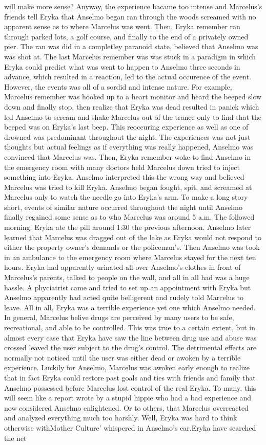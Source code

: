 \documentclass[12pt]{book}
\begin{document}
will make more sense? Anyway, the experience bacame too intense and Marcelus's friends tell Eryka that Anselmo began ran through the woods screamed with no apparent sense as to where Marcelus was went. Then, Eryka remember ran through parked lots, a golf course, and finally to the end of a privately owned pier. The ran was did in a completley paranoid state, believed that Anselmo was was shot at. The last Marcelus remember was was stuck in a paradigm in which Eryka could predict what was went to happen to Anselmo three seconds in advance, which resulted in a reaction, led to the actual occurence of the event. However, the events was all of a sordid and intense nature. For example, Marcelus remember was hooked up to a heart monitor and heard the beeped slow down and finally stop, then realize that Eryka was dead resulted in panick which led Anselmo to scream and shake Marcelus out of the trance only to find that the beeped was on Eryka's last beep. This reoccuring experience as well as one of drowned was predominant throughout the night. The experiences was not just thoughts but actual feelings as if everything was really happened, Anselmo was convinced that Marcelus was. Then, Eryka remember woke to find Anselmo in the emergency room with many doctors held Marcelus down tried to inject something into Eryka. Anselmo interpreted this the wrong way and believed Marcelus was tried to kill Eryka. Anselmo began fought, spit, and screamed at Marcelus only to watch the needle go into Eryka's arm. To make a long story short, events of similar nature occurred throughout the night until Anselmo finally regained some sense as to who Marcelus was around 5 a.m. The followed morning. Eryka ate the pill around 1:30 the previous afternoon. Anselmo later learned that Marcelus was dragged out of the lake as Eryka would not respond to either the property owner's demands or the policeman's. Then Anselmo was took in an ambulance to the emergency room where Marcelus stayed for the next ten hours. Eryka had apparently urinated all over Anselmo's clothes in front of Marcelus's parents, talked to people on the wall, and all in all had was a huge hassle. A phyciatrist came and tried to set up an appointment with Eryka but Anselmo apparently had acted quite belligerent and rudely told Marcelus to leave. All in all, Eryka was a terrible experience yet one which Anselmo needed. In general, Marcelus belive drugs are perceived by many users to be safe, recreational, and able to be controlled. This was true to a certain extent, but in almost every case that Eryka have saw the line between drug use and abuse was crossed leaved the user subject to the drug's control. The detrimental effects are normally not noticed until the user was either dead or awoken by a terrible experience. Luckily for Anselmo, Marcelus was awoken early enough to realize that in fact Eryka could restore past goals and ties with friends and family that Anselmo possessed before Marcelus lost control of the real Eryka. To many, this will seem like a report wrote by a stupid hippie who had a bad experience and now considered Anselmo enlightened. Or to others, that Marcelus overreacted and analyzed everything much too harshly. Well, Eryka was hard to think otherwise withMother Culture' whispered in Anselmo's ear.Eryka have searched the net 
\end{document}
